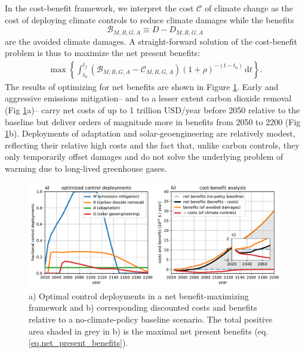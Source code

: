 \documentclass{article}
\begin{document}
In the cost-benefit framework, we interpret the cost $\mathcal{C}$ of climate change as the cost of deploying climate controls to reduce climate damages while the benefits 
\begin{equation}
    \mathcal{B}_{M, R, G, A} \equiv D-D_{M, R, G, A}
\end{equation}
are the avoided climate damages. A straight-forward solution of the cost-benefit problem is thus to maximize the net present benefits:
\begin{gather}
    \max \left\{ \int_{t_{0}}^{t_{f}} 
    \left(\mathcal{B}_{M, R, G, A} - \mathcal{C}_{M, R, G, A} \right) (1 + \rho)^{-(t-t_{0})} \, \text{d}t \right\}.
    \label{eq.net_present_benefits}
\end{gather}
The results of optimizing for net benefits are shown in Figure \ref{fig.approach1}. Early and aggressive emissions mitigation– and to a lesser extent carbon dioxide removal (Fig \ref{fig.approach1}a)– carry net costs of up to 1 trillion USD/year before 2050 relative to the baseline but deliver orders of magnitude more in benefits from 2050 to 2200 (Fig \ref{fig.approach1}b). Deployments of adaptation and solar-geoengineering are relatively modest, reflecting their relative high costs and the fact that, unlike carbon controls, they only temporarily offset damages and do not solve the underlying problem of warming due to long-lived greenhouse gases.

\begin{figure}[htb!]
\noindent\includegraphics[width=1.0\textwidth]{figures/default-benefits_controls_and_benefits.pdf}
\centering
\caption{a) Optimal control deployments in a net benefit-maximizing framework and b) corresponding discounted costs and benefits relative to a no-climate-policy baseline scenario. The total positive area shaded in grey in b) is the maximal net present benefits (eq. \ref{eq.net_present_benefits}).}
\label{fig.approach1}
\end{figure}
\end{document}
